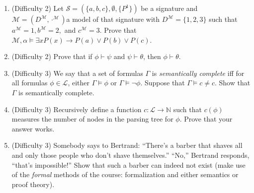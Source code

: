\begin{enumerate}[\thesection.1]
\item (Difficulty 2) Let $\mathcal{S}=(\{a,b,c\},
  \emptyset,\{P^1\})$ be a signature and
    $\mathcal{M}=(D^\mathcal{M},\cdot^\mathcal{M})$a model of that
    signature with $D^\mathcal{M}=\{1,2,3\}$ such that $a^\mathcal{M}=1,
    b^\mathcal{M}=2,$ and $c^\mathcal{M}=3$. Prove that
    $\mathcal{M},\alpha\vDash \exists xP(x)\to P(a)\lor
    P(b)\lor P(c)$.

  \item (Difficulty 2) Prove that if $\phi\vdash\psi$ and $\psi\vdash\theta$, then
    $\phi\vdash\theta$.

 \item (Difficulty 3) We say that a set of formulas $\Gamma$ is \emph{semantically
      complete} iff for all formulas $\phi\in\mathcal{L}$, either
    $\Gamma\vDash\phi$ or $\Gamma\vDash\neg\phi$. Suppose that
    $\Gamma\vDash c\neq c$. Show that $\Gamma$ is semantically
    complete.

    \item (Difficulty 3) Recursively define a function
      $c:\mathcal{L}\to\mathbb{N}$ such that $c(\phi)$ measures the
      number of nodes in the parsing tree for $\phi$. Prove that your
      answer works.

\item (Difficulty 3) Somebody says to Bertrand: ``There's a barber that shaves all
  and only those people who don't shave themselves.'' ``No,''
  Bertrand responds, ``that's impossible!'' Show that such a barber
  can indeed not exist (make use of the \emph{formal} methods of the
  course: formalization and either semantics or proof theory).
	
	\end{enumerate}

